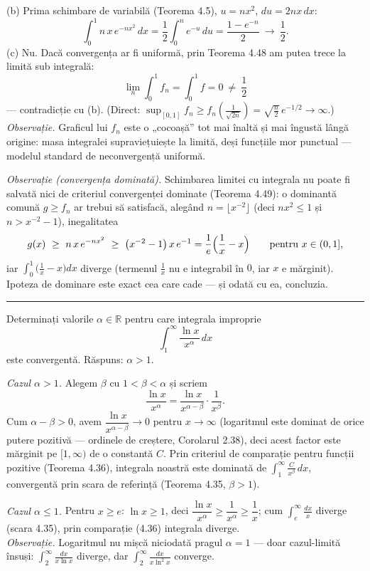 (b) Prima schimbare de variabilă (Teorema 4.5), $u=nx^2$, $du=2nx\,dx$:
\[ \int_0^1n\,x\,e^{-nx^2}\,dx=\frac12\int_0^ne^{-u}\,du=\frac{1-e^{-n}}{2}\ \longrightarrow\ \frac12 . \]
(c) Nu. Dacă convergența ar fi uniformă, prin Teorema 4.48 am putea trece la limită sub integrală:
\[ \lim_n\int_0^1f_n=\int_0^1f=0\ \neq\ \frac12 \]
--- contradicție cu (b). (Direct: $\sup_{[0,1]}f_n\ge f_n\!\left(\frac1{\sqrt{2n}}\right)=\sqrt{\frac n2}\,e^{-1/2}\to\infty$.)\\[2pt]
\emph{Observație.} Graficul lui $f_n$ este o „cocoașă'' tot mai înaltă și mai îngustă lângă origine: masa integralei supraviețuiește la limită, deși funcțiile mor punctual --- modelul standard de neconvergență uniformă.

\emph{Observație (convergența dominată).} Schimbarea limitei cu integrala nu poate fi salvată nici de criteriul convergenței dominate (Teorema 4.49): o dominantă comună $g\ge f_{n}$ ar trebui să satisfacă, alegând $n=\lfloor x^{-2}\rfloor$ (deci $nx^{2}\le1$ și $n>x^{-2}-1$), inegalitatea
\[ g(x)\ \ge\ n\,x\,e^{-nx^{2}}\ \ge\ \bigl(x^{-2}-1\bigr)\,x\,e^{-1}=\frac1e\Bigl(\frac1x-x\Bigr)\qquad\text{pentru }x\in(0,1], \]
iar $\int_{0}^{1}\bigl(\frac1x-x\bigr)dx$ diverge (termenul $\frac1x$ nu e integrabil în $0$, iar $x$ e mărginit). Ipoteza de dominare este exact cea care cade --- și odată cu ea, concluzia.
\vspace{1mm}\hrule

Determinați valorile $\alpha\in\mathbb{R}$ pentru care integrala improprie
\[ \int_1^\infty\frac{\ln x}{x^\alpha}\,dx \]
este convergentă.
\sol Răspuns: $\alpha>1$.

\emph{Cazul $\alpha>1$.} Alegem $\beta$ cu $1<\beta<\alpha$ și scriem
\[ \frac{\ln x}{x^\alpha}=\frac{\ln x}{x^{\alpha-\beta}}\cdot\frac1{x^\beta} . \]
Cum $\alpha-\beta>0$, avem $\dfrac{\ln x}{x^{\alpha-\beta}}\to0$ pentru $x\to\infty$ (logaritmul este dominat de orice putere pozitivă --- ordinele de creștere, Corolarul 2.38), deci acest factor este mărginit pe $[1,\infty)$ de o constantă $C$. Prin criteriul de comparație pentru funcții pozitive (Teorema 4.36), integrala noastră este dominată de $\int_1^\infty\frac{C}{x^\beta}\,dx$, convergentă prin scara de referință (Teorema 4.35, $\beta>1$).

\emph{Cazul $\alpha\le1$.} Pentru $x\ge e$: $\ln x\ge1$, deci $\dfrac{\ln x}{x^\alpha}\ge\dfrac1{x^\alpha}\ge\dfrac1x$; cum $\int_e^\infty\frac{dx}x$ diverge (scara 4.35), prin comparație (4.36) integrala diverge.\\[2pt]
\emph{Observație.} Logaritmul nu mișcă niciodată pragul $\alpha=1$ --- doar cazul-limită însuși: $\int_2^\infty\frac{dx}{x\ln x}$ diverge, dar $\int_2^\infty\frac{dx}{x\ln^2x}$ converge.

